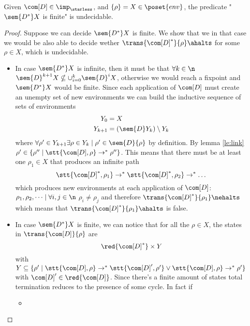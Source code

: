 \begin{lemma}\label{le:infiniteness}
  Given \(\com[D]\in\imp_\starless\), and \(\{\rho\} = X \in
  \poset{env}\), the predicate "\(\sem{D^*}X\) is finite" is
  undecidable.
\end{lemma}

\begin{proof}
  Suppose we can decide \(\sem{D^*}X\) is finite. We show that we in
  that case we would be also able to decide wether
  \(\trans{\com[D]^*}{\rho}\ahalts\) for some \(\rho \in X\), which is
  undecidable.%
  \begin{itemize}
  \item In case \(\sem{D^*}X\) is infinite, then it must be that
    \(\forall k \in \n\) \(\sem{D}^{k+1}X \nsubseteq
    \cup_{i=0}^k\sem{D}^iX\), otherwise we would reach a fixpoint
    and \(\sem{D^*}X\) would be finite. Since each application of
    \(\com[D]\) must create an unempty set of new environments we can
    build the inductive sequence of sets of environments
    \begin{align*}
      Y_0 & = X \\
      Y_{k+1} & = (\sem{D}Y_k)\setminus Y_k
    \end{align*}
    where \(\forall \rho' \in Y_{k+1} \exists \rho \in Y_k \mid \rho'
    \in \sem{D}\{\rho\}\) by definition. By lemma \ref{le:link}
    \(\rho' \in \{\rho'' \mid \stt{\com[D], \rho} \to^*
    \rho''\}\). This means that there must be at least one \(\rho_1\in
    X\) that produces an infinite path \[\stt{\com[D]^*,
      \rho_1}\to^*\stt{\com[D]^*, \rho_2}\to^*\dots \] which produces
    new environments at each application of \(\com[D]\): \(\rho_1,
    \rho_2, \dots \mid \forall i,j \in \n\) \(\rho_i \neq \rho_j\) and
    therefore \(\trans{\com[D]^*}{\rho_1} \nehalts\) which means that
    \(\trans{\com[D]^*}{\rho_1}\ahalts\) is false.
  \item In case \(\sem{D^*}X\) is finite, we can notice that for all
    the \(\rho \in X\), the states in \(\trans{\com[D]}{\rho}\)
    are \[\red{\com[D]^*}\times Y\] with
    \(Y \subseteq \{\rho'\mid \stt{\com[D], \rho} \to^* \stt{\com[D]',
      \rho'} \vee \stt{\com[D],\rho} \to^* \rho'\}\) with
    \(\com[D]'\in \red{\com[D]}\). Since there's a finite amount of
    states total termination reduces to the presence of some cycle. In
    fact if
    \begin{itemize}
    \item

\end{itemize}
\end{itemize}
\end{proof}
